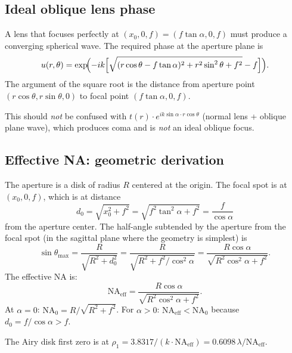 \documentclass[11pt,a4paper]{article}
\begin{document}
\subsection{Ideal oblique lens phase}

A lens that focuses perfectly at $(x_0,0,f) = (f\tan\alpha,0,f)$ must produce a
converging spherical wave.  The required phase at the aperture plane is
\begin{equation}\label{eq:oblique_lens}
  u(r,\theta) = \exp\!\Bigl(-ik\Bigl[
    \sqrt{(r\cos\theta - f\tan\alpha)^2 + r^2\sin^2\theta + f^2}
    - f\Bigr]\Bigr).
\end{equation}
The argument of the square root is the distance from aperture point
$(r\cos\theta, r\sin\theta, 0)$ to focal point $(f\tan\alpha, 0, f)$.

This should \emph{not} be confused with
$t(r)\cdot e^{ik\sin\alpha\cdot r\cos\theta}$ (normal lens + oblique plane wave),
which produces coma and is \emph{not} an ideal oblique focus.

\subsection{Effective NA: geometric derivation}

The aperture is a disk of radius $R$ centered at the origin.  The focal spot is at
$(x_0, 0, f)$, which is at distance
\begin{equation}
  d_0 = \sqrt{x_0^2 + f^2} = \sqrt{f^2\tan^2\alpha + f^2} = \frac{f}{\cos\alpha}
\end{equation}
from the aperture center.  The half-angle subtended by the aperture from the focal
spot (in the sagittal plane where the geometry is simplest) is
\begin{equation}
  \sin\theta_{\max} = \frac{R}{\sqrt{R^2 + d_0^2}}
  = \frac{R}{\sqrt{R^2 + f^2/\cos^2\alpha}}
  = \frac{R\cos\alpha}{\sqrt{R^2\cos^2\alpha + f^2}}.
\end{equation}
The effective NA is:
\begin{equation}\label{eq:NA_eff}
  \boxed{
  \mathrm{NA}_{\mathrm{eff}}
  = \frac{R\cos\alpha}{\sqrt{R^2\cos^2\alpha + f^2}}.
  }
\end{equation}
At $\alpha=0$: $\mathrm{NA}_0 = R/\sqrt{R^2+f^2}$.  For $\alpha > 0$:
$\mathrm{NA}_{\mathrm{eff}} < \mathrm{NA}_0$ because $d_0 = f/\cos\alpha > f$.

The Airy disk first zero is at
$\rho_1 = 3.8317/(k\cdot\mathrm{NA}_{\mathrm{eff}}) = 0.6098\,\lambda/\mathrm{NA}_{\mathrm{eff}}$.
\end{document}
